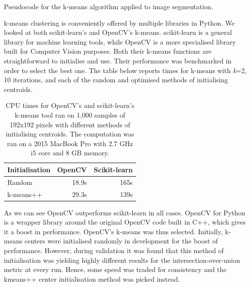 \begin{algorithm}[h]
    \DontPrintSemicolon

\caption{Pseudocode for the k-means algorithm applied to image segmentation.}
\label{alg:kmeans}
\end{algorithm}

k-means clustering is conveniently offered by multiple libraries in Python. We looked at both scikit-learn's and OpenCV's k-means. scikit-learn is a general library  for machine learning tools, while OpenCV is a more specialised library built for Computer Vision purposes. Both their k-means functions are straightforward to initialise and use. Their performance was benchmarked in order to select the best one. The table below reports times for k-means with \textit{k}=2, 10 iterations, and each of the random and optimised methods of initialising centroids.

\begin{table}[h]
\centering
\begin{tabular}{|l|l|l|}
\hline
\textbf{Initialisation} & \textbf{OpenCV} & \textbf{Scikit-learn} \\ \hline
Random                                   & \multicolumn{1}{r|}{18.9s}       & \multicolumn{1}{r|}{165s}              \\ \hline
k-means++                                & \multicolumn{1}{r|}{29.3s}       & \multicolumn{1}{r|}{139s}              \\ \hline
\end{tabular}

\caption{CPU times for OpenCV's and scikit-learn's k-means tool ran on 1,000 samples of 192x192 pixels with different methods of initialising centroids.  The computation was ran on a 2015 MacBook Pro with 2.7 GHz i5 core and 8 GB memory.}
\end{table}

As we can see OpenCV outperforms scikit-learn in all cases. OpenCV for Python is a wrapper library around the original OpenCV code built in C++, which gives it a boost in performance. OpenCV's k-means was thus selected. Initially, k-means centers were initialised randomly in development for the boost of performance. However, during validation it was found that this method of initialisation was yielding highly different results for the intersection-over-union metric at every run. Hence, some speed was traded for consistency and the kmeans++ center initialisation method was picked instead.

